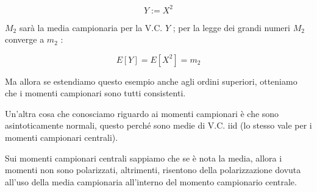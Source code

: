     \[ Y:=X^2 \]

$M_2$ sarà la media campionaria per la V.C. $Y$ ; per la legge dei grandi numeri $M_2$ converge a $m_2$ :

    \[ E[Y]=E[X^2]=m_2 \]

Ma allora se estendiamo questo esempio anche agli ordini superiori, otteniamo che i momenti campionari sono tutti consistenti.\newline

Un'altra cosa che conosciamo riguardo ai momenti campionari è che sono asintoticamente normali, questo perché sono medie di V.C. iid (lo stesso vale per i momenti campionari centrali).\newline

Sui momenti campionari centrali sappiamo che se è nota la media, allora i momenti non sono polarizzati, altrimenti, risentono della polarizzazione dovuta all'uso della media campionaria all'interno del momento campionario centrale.
  

